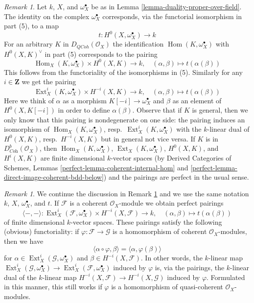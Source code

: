 \documentclass{stacks-project}
\theoremstyle{plain}
\theoremstyle{definition}
\theoremstyle{remark}
\newtheorem{remark}[subsection]{Remark}
\numberwithin{equation}{subsection}
\def\Hom{\mathop{\mathrm{Hom}}\nolimits}
\def\Ext{\mathop{\mathrm{Ext}}\nolimits}
\def\QCoh{\mathit{QCoh}}
\begin{document}
\begin{remark}
\label{remark-duality-proper-over-field}
Let $k$, $X$, and $\omega_X^\bullet$
be as in Lemma \ref{lemma-duality-proper-over-field}.
The identity on the complex $\omega_X^\bullet$ corresponds, via
the functorial isomorphism in part (5), to a map
$$
t : H^0(X, \omega_X^\bullet) \longrightarrow k
$$
For an arbitrary $K$ in $D_\QCoh(\mathcal{O}_X)$ the identification
$\Hom(K, \omega_X^\bullet)$ with $H^0(X, K)^\vee$ in part (5)
corresponds to the pairing
$$
\Hom_X(K, \omega_X^\bullet) \times H^0(X, K) \longrightarrow k,\quad
(\alpha, \beta) \longmapsto t(\alpha(\beta))
$$
This follows from the functoriality of the isomorphisms in (5). Similarly
for any $i \in \mathbf{Z}$ we get the pairing
$$
\Ext^i_X(K, \omega_X^\bullet) \times H^{-i}(X, K) \longrightarrow k,\quad
(\alpha, \beta) \longmapsto t(\alpha(\beta))
$$
Here we think of $\alpha$ as a morphism $K[-i] \to \omega_X^\bullet$
and $\beta$ as an element of $H^0(X, K[-i])$ in order to define
$\alpha(\beta)$. Observe that if $K$ is general, then we only know
that this pairing is nondegenerate on one side: the pairing induces an
isomorphism of $\Hom_X(K, \omega_X^\bullet)$,
resp.\ $\Ext^i_X(K, \omega_X^\bullet)$ with the $k$-linear dual of $H^0(X, K)$,
resp.\ $H^{-i}(X, K)$ but in general not vice versa. If $K$
is in $D^b_{\textit{Coh}}(\mathcal{O}_X)$, then
$\Hom_X(K, \omega_X^\bullet)$, $\Ext_X(K, \omega_X^\bullet)$,
$H^0(X, K)$, and $H^i(X, K)$ are finite dimensional $k$-vector spaces (by
Derived Categories of Schemes, Lemmas
\ref{perfect-lemma-coherent-internal-hom} and
\ref{perfect-lemma-direct-image-coherent-bdd-below})
and the pairings are perfect in the usual sense.
\end{remark}

\begin{remark}
\label{remark-coherent-duality-proper-over-field}
We continue the discussion in Remark \ref{remark-duality-proper-over-field}
and we use the same notation $k$, $X$, $\omega_X^\bullet$, and $t$.
If $\mathcal{F}$ is a coherent $\mathcal{O}_X$-module we obtain
perfect pairings
$$
\langle -, - \rangle :
\Ext^i_X(\mathcal{F}, \omega_X^\bullet) \times H^{-i}(X,\mathcal{F})
\longrightarrow k,\quad
(\alpha, \beta) \longmapsto t(\alpha(\beta))
$$
of finite dimensional $k$-vector spaces. These pairings satisfy the
following (obvious) functoriality: if $\varphi : \mathcal{F} \to \mathcal{G}$
is a homomorphism of coherent $\mathcal{O}_X$-modules, then we have
$$
\langle \alpha \circ \varphi, \beta \rangle =
\langle \alpha, \varphi(\beta) \rangle
$$
for $\alpha \in \Ext^i_X(\mathcal{G}, \omega_X^\bullet)$ and
$\beta \in H^{-i}(X, \mathcal{F})$. In other words, the $k$-linear map
$\Ext^i_X(\mathcal{G}, \omega_X^\bullet) \to
\Ext^i_X(\mathcal{F}, \omega_X^\bullet)$ induced by $\varphi$
is, via the pairings, the $k$-linear dual of the $k$-linear map
$H^{-i}(X, \mathcal{F}) \to H^{-i}(X, \mathcal{G})$ induced
by $\varphi$. Formulated in this manner, this still works if
$\varphi$ is a homomorphism of quasi-coherent $\mathcal{O}_X$-modules.
\end{remark}
\end{document}

